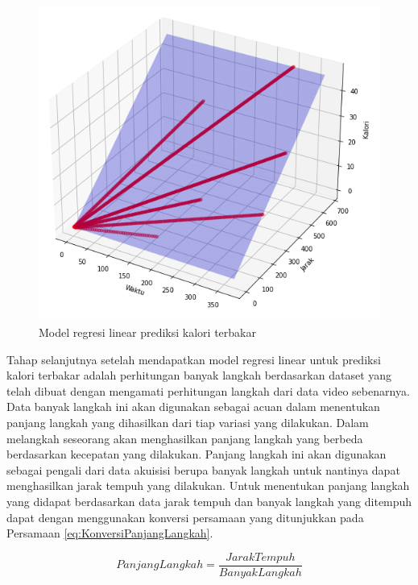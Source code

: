 \begin{figure}[H]
  \centering
  \includegraphics[scale=0.6]{gambar/model regresi kalori3.png}
  \caption{Model regresi linear prediksi kalori terbakar}
  \label{fig:ModelRegresiKalori}
\end{figure}

Tahap selanjutnya setelah mendapatkan model regresi linear untuk prediksi kalori terbakar adalah perhitungan banyak langkah berdasarkan dataset yang telah dibuat dengan mengamati perhitungan langkah dari data video sebenarnya. Data banyak langkah ini akan digunakan sebagai acuan dalam menentukan panjang langkah yang dihasilkan dari tiap variasi yang dilakukan. Dalam melangkah seseorang akan menghasilkan panjang langkah yang berbeda berdasarkan kecepatan yang dilakukan. Panjang langkah ini akan digunakan sebagai pengali dari data akuisisi berupa banyak langkah untuk nantinya dapat menghasilkan jarak tempuh yang dilakukan. Untuk menentukan panjang langkah yang didapat berdasarkan data jarak tempuh dan banyak langkah yang ditempuh dapat dengan menggunakan konversi persamaan yang ditunjukkan pada Persamaan \ref{eq:KonversiPanjangLangkah}.

\begin{equation}
  \label{eq:KonversiPanjangLangkah}
  Panjang Langkah = \frac{Jarak Tempuh}{Banyak Langkah}
\end{equation}

